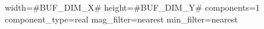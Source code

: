 width=#BUF_DIM_X#
height=#BUF_DIM_Y#
components=1
component_type=real
mag_filter=nearest
min_filter=nearest
